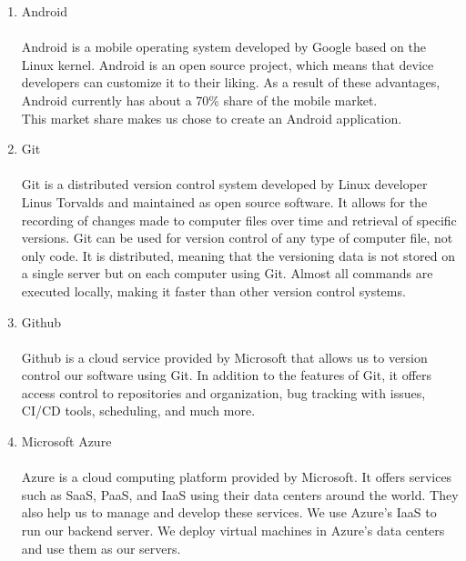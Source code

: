 \begin{enumerate}[label=\arabic*]
\begin{enumerate}[label=\alph*.]
            \item Android\\
            \\
            Android is a mobile operating system developed by Google based on the Linux kernel. Android is an open source project, which means that device developers can customize it to their liking. As a result of these advantages, Android currently has about a 70\% share of the mobile market.
            \cite{StatCounter}
            \\
            This market share makes us chose to create an Android application.\\

            \item Git\\
            \\
            Git is a distributed version control system developed by Linux developer Linus Torvalds and maintained as open source software. It allows for the recording of changes made to computer files over time and retrieval of specific versions. Git can be used for version control of any type of computer file, not only code. It is distributed, meaning that the versioning data is not stored on a single server but on each computer using Git. Almost all commands are executed locally, making it faster than other version control systems. \\

            \item Github\\
            \\
            Github is a cloud service provided by Microsoft that allows us to version control our software using Git. In addition to the features of Git, it offers access control to repositories and organization, bug tracking with issues, CI/CD tools, scheduling, and much more.\\

            \item Microsoft Azure\\
            \\
            Azure is a cloud computing platform provided by Microsoft. It offers services such as SaaS, PaaS, and IaaS using their data centers around the world. They also help us to manage and develop these services. We use Azure's IaaS to run our backend server. We deploy virtual machines in Azure's data centers and use them as our servers.\\


\end{enumerate}
\end{enumerate}
